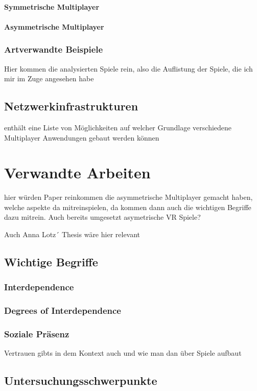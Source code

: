 \subsubsection{Symmetrische Multiplayer}

\subsubsection{Asymmetrische Multiplayer}

\subsection{Artverwandte Beispiele}
Hier kommen die analysierten Spiele rein, also die Auflistung der Spiele, die ich mir im Zuge angesehen habe

\section{Netzwerkinfrastrukturen}

enthält eine Liste von Möglichkeiten auf welcher Grundlage verschiedene Multiplayer Anwendungen gebaut werden können


\chapter{Verwandte Arbeiten}

\cite{harris_asymmetry_2019}
\cite{sajjadi_maze_2014}

hier würden Paper reinkommen die asymmetrische Multiplayer gemacht haben, welche aspekte da mitreinspielen, da kommen dann auch die wichtigen Begriffe dazu mitrein. Auch bereits umgesetzt asymetrische VR Spiele?


Auch Anna Lotz´ Thesis wäre hier relevant


\section{Wichtige Begriffe}

\subsection{Interdependence}
\cite{harris_leveraging_2016}
\cite{depping_cooperation_2017}

\subsection{Degrees of Interdependence}
\cite{beznosyk_effect_2012}

\subsection{Soziale Präsenz}

Vertrauen gibts in dem Kontext auch und wie man dan über Spiele aufbaut

\section{Untersuchungsschwerpunkte}